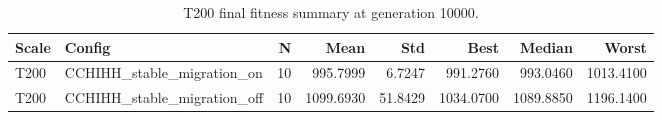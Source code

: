 \begin{table}[htbp]
\centering
\caption{T200 final fitness summary at generation 10000.}
\label{tab:t200_final_fitness_summary}
\begin{tabular}{llrrrrrr}
\toprule
Scale & Config & N & Mean & Std & Best & Median & Worst \\
\midrule
T200 & CCHIHH_stable_migration_on & 10 & 995.7999 & 6.7247 & 991.2760 & 993.0460 & 1013.4100 \\
T200 & CCHIHH_stable_migration_off & 10 & 1099.6930 & 51.8429 & 1034.0700 & 1089.8850 & 1196.1400 \\
\bottomrule
\end{tabular}
\end{table}
